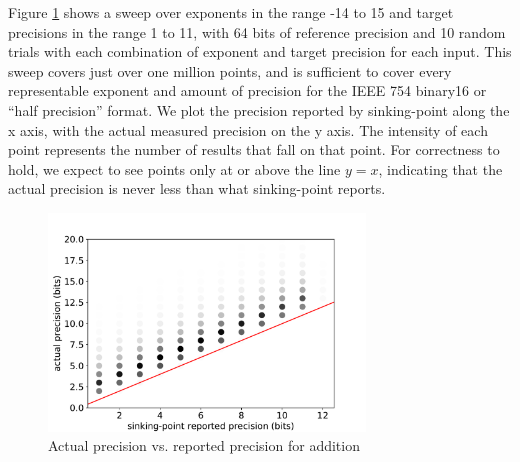 \documentclass[letterpaper,10pt]{article}
\begin{document}
Figure \ref{fig:add_scatter} shows a sweep over exponents in the range -14 to 15 and target precisions in the range 1 to 11, with 64 bits of reference precision and 10 random trials with each combination of exponent and target precision for each input. This sweep covers just over one million points, and is sufficient to cover every representable exponent and amount of precision for the IEEE 754 binary16 or ``half precision'' format. We plot the precision reported by sinking-point along the x axis, with the actual measured precision on the y axis. The intensity of each point represents the number of results that fall on that point. For correctness to hold, we expect to see points only at or above the line $y = x$, indicating that the actual precision is never less than what sinking-point reports.

\begin{figure}
\caption{Actual precision vs. reported precision for addition} \label{fig:add_scatter} \vspace{-10pt}
\begin{center}
\includegraphics[width=0.75\textwidth]{add_scatter.pdf}
\end{center}
\end{figure}
\end{document}
